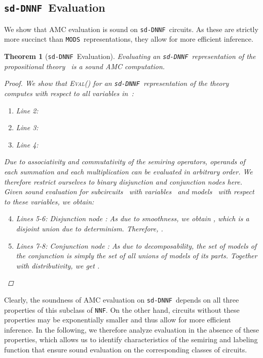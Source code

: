 \documentclass{article}
\theoremstyle{plain}
\newtheorem{theorem}{Theorem}
\theoremstyle{definition}
\newcommand{\NNF}{{\tt NNF}}
\newcommand{\sdDNNF}{{\tt sd-DNNF}}
\newcommand{\MODS}{{\tt MODS}}
\begin{document}
\subsection{\sdDNNF\ Evaluation}
We show that AMC evaluation is sound on \sdDNNF\ circuits.
As these are strictly more succinct than \MODS\ representations, they allow for
more efficient inference.
\begin{theorem}[\sdDNNF\ Evaluation]\label{th:sdDNNF}
  Evaluating an \sdDNNF\ representation of the propositional theory~ is a sound AMC computation.
  \begin{proof}
  We show that \textsc{Eval}() for an \sdDNNF\
  representation  of the theory   computes
   with respect to all variables
  in~:
\begin{enumerate}
\item Line 2: 
  
 \item Line 3: 
  
\item Line 4: 
  
\end{enumerate}
Due to associativity and commutativity of the semiring
  operators, operands of each summation and each multiplication can be
  evaluated in arbitrary order. We therefore restrict ourselves to
  binary disjunction and conjunction nodes here. 
 Given sound evaluation for subcircuits~
  with variables~ and models~ with
  respect to these variables, we obtain:
\begin{enumerate}
\setcounter{enumi}{3}
\item Lines 5-6:  
Disjunction node : 
As  
due to smoothness, we obtain , which is a disjoint union due to determinism. Therefore,
.
\item Lines 7-8: 
Conjunction node : As
 due to decomposability,
the set  of models of the conjunction
is simply the set of all unions of models of its parts. Together with distributivity, we get .
\end{enumerate}\end{proof}
\end{theorem}

Clearly, the soundness of AMC evaluation on  \sdDNNF\ depends on all three
properties of this subclass of \NNF. On the other hand, circuits without these properties may be exponentially smaller and thus allow
for more efficient inference. 
In the following, we therefore analyze evaluation in the absence of these properties, which allows us to identify characteristics of the semiring and labeling function that ensure sound evaluation on the corresponding classes
of circuits.
\end{document}
